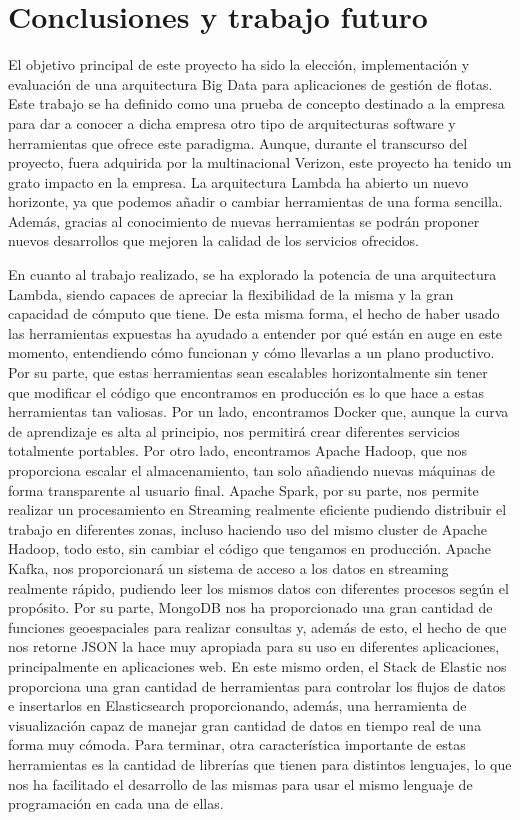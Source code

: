 \chapter{Conclusiones y trabajo futuro}

El objetivo principal de este proyecto ha sido la elección, implementación
y evaluación de una arquitectura Big Data para aplicaciones de gestión de
flotas. Este trabajo se ha definido como una prueba de concepto destinado a
la empresa \mdata{} para dar a conocer a dicha empresa otro tipo de
arquitecturas software y herramientas que ofrece este paradigma. Aunque,
durante el transcurso del proyecto, \mdata{} fuera adquirida por la
multinacional Verizon, este proyecto ha tenido un grato impacto en la
empresa. La arquitectura Lambda ha abierto un nuevo horizonte, ya que
podemos añadir o cambiar herramientas de una forma sencilla. Además,
gracias al conocimiento de nuevas herramientas se podrán proponer nuevos
desarrollos que mejoren la calidad de los servicios ofrecidos.

En cuanto al trabajo realizado, se ha explorado la potencia de una
arquitectura Lambda, siendo capaces de apreciar la flexibilidad de la misma
y la gran capacidad de cómputo que tiene. De esta misma forma, el hecho de
haber usado las herramientas expuestas ha ayudado a entender por qué están
en auge en este momento, entendiendo cómo funcionan y cómo llevarlas a un
plano productivo. Por su parte, que estas herramientas sean escalables
horizontalmente sin tener que modificar el código que encontramos en
producción es lo que hace a estas herramientas tan valiosas. Por un lado,
encontramos Docker que, aunque la curva de aprendizaje es alta al
principio, nos permitirá crear diferentes servicios totalmente portables.
Por otro lado, encontramos Apache Hadoop, que nos proporciona escalar el
almacenamiento, tan solo añadiendo nuevas máquinas de forma transparente al
usuario final. Apache Spark, por su parte, nos permite realizar un
procesamiento en Streaming realmente eficiente pudiendo distribuir el
trabajo en diferentes zonas, incluso haciendo uso del mismo cluster de
Apache Hadoop, todo esto, sin cambiar el código que tengamos en producción.
Apache Kafka, nos proporcionará un sistema de acceso a los datos en
streaming realmente rápido, pudiendo leer los mismos datos con diferentes
procesos según el propósito. Por su parte, MongoDB nos ha proporcionado una
gran cantidad de funciones geoespaciales para realizar consultas y, además
de esto, el hecho de que nos retorne JSON la hace muy apropiada para su uso
en diferentes aplicaciones, principalmente en aplicaciones web. En este
mismo orden, el Stack de Elastic nos proporciona una gran cantidad de
herramientas para controlar los flujos de datos e insertarlos en
Elasticsearch proporcionando, además, una herramienta de visualización
capaz de manejar gran cantidad de datos en tiempo real de una forma muy
cómoda. Para terminar, otra característica importante de estas herramientas
es la cantidad de librerías que tienen para distintos lenguajes, lo que nos
ha facilitado el desarrollo de las mismas para usar el mismo lenguaje de
programación en cada una de ellas.

